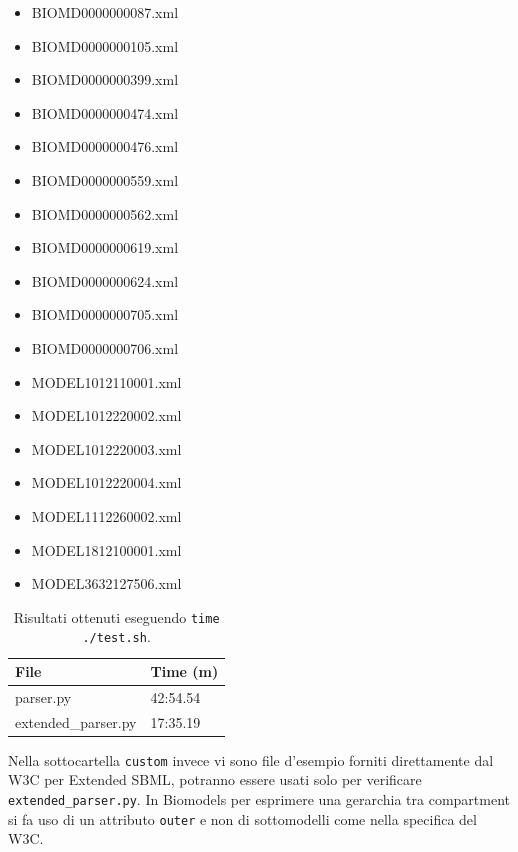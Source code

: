 \documentclass{article}
\begin{document}
\begin{itemize}
    \item BIOMD0000000087.xml
    \item BIOMD0000000105.xml
    \item BIOMD0000000399.xml
    \item BIOMD0000000474.xml
    \item BIOMD0000000476.xml
    \item BIOMD0000000559.xml
    \item BIOMD0000000562.xml
    \item BIOMD0000000619.xml
    \item BIOMD0000000624.xml
    \item BIOMD0000000705.xml
    \item BIOMD0000000706.xml
    \item MODEL1012110001.xml
    \item MODEL1012220002.xml
    \item MODEL1012220003.xml
    \item MODEL1012220004.xml
    \item MODEL1112260002.xml
    \item MODEL1812100001.xml
    \item MODEL3632127506.xml
\end{itemize}

\begin{table}[h!t] 
    \centering
    \begin{longtable}{p{}p{}}
        \textbf{File} & \textbf{Time (m)} \\
        \hline
        parser.py & 42:54.54 \\
        extended\_parser.py & 17:35.19 \\
        \hline
    \end{longtable}
    \caption{Risultati ottenuti eseguendo \texttt{time ./test.sh}.}
    \label{tab:performance}
\end{table}

Nella sottocartella \texttt{custom} invece vi sono file d'esempio forniti direttamente dal W3C per Extended SBML, potranno essere usati solo per verificare \texttt{extended\_parser.py}. In Biomodels per esprimere una gerarchia tra compartment si fa uso di un attributo \texttt{outer} e non di sottomodelli come nella specifica del W3C.
\end{document}

